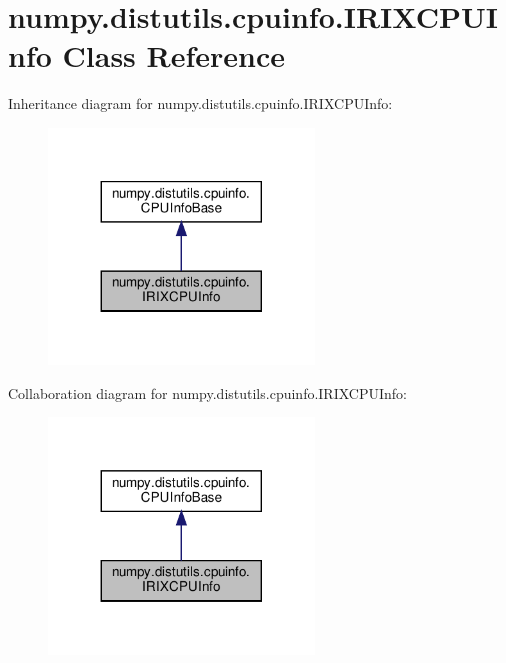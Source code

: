 \hypertarget{classnumpy_1_1distutils_1_1cpuinfo_1_1IRIXCPUInfo}{}\section{numpy.\+distutils.\+cpuinfo.\+I\+R\+I\+X\+C\+P\+U\+Info Class Reference}
\label{classnumpy_1_1distutils_1_1cpuinfo_1_1IRIXCPUInfo}


Inheritance diagram for numpy.\+distutils.\+cpuinfo.\+I\+R\+I\+X\+C\+P\+U\+Info\+:
\nopagebreak
\begin{figure}[H]
\begin{center}
\leavevmode
\includegraphics[width=200pt]{classnumpy_1_1distutils_1_1cpuinfo_1_1IRIXCPUInfo__inherit__graph}
\end{center}
\end{figure}


Collaboration diagram for numpy.\+distutils.\+cpuinfo.\+I\+R\+I\+X\+C\+P\+U\+Info\+:
\nopagebreak
\begin{figure}[H]
\begin{center}
\leavevmode
\includegraphics[width=200pt]{classnumpy_1_1distutils_1_1cpuinfo_1_1IRIXCPUInfo__coll__graph}
\end{center}
\end{figure}
